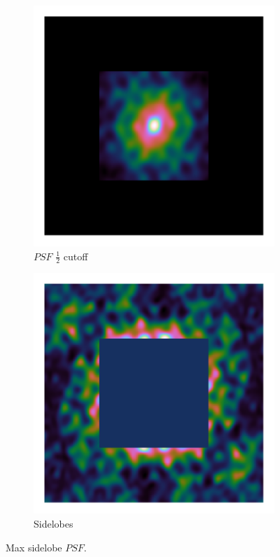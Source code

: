 \begin{figure}[h]
	\centering
	\begin{subfigure}[b]{0.3\linewidth}
		\includegraphics[width=\linewidth, clip, trim= 0.25in 0.25in 0.25in 0.25in]{./chapters/03.cd/simulated/psfCut.png}
		\caption{$PSF$ $\frac{1}{2}$ cutoff}
	\end{subfigure}
	\begin{subfigure}[b]{0.3\linewidth}
		\includegraphics[width=\linewidth, clip, trim= 0.25in 0.25in 0.25in 0.25in]{./chapters/03.cd/simulated/psfReverseCut.png}
		\caption{Sidelobes}
		\label{gradient:convergence:reverseCut}
	\end{subfigure}
	
	\caption{Max sidelobe $PSF$.}
	\label{gradient:convergence:sidelobe}
\end{figure}

